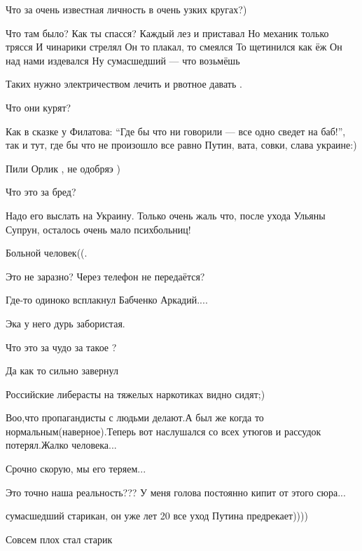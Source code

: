 \begin{itemize}
Что за очень известная личность в очень узких кругах?)


\obeycr
Что там было? Как ты спасся?
Каждый лез и приставал
Но механик только трясся
И чинарики стрелял
Он то плакал, то смеялся
То щетинился как ёж
Он над нами издевался
Ну сумасшедший — что возьмёшь
\restorecr

Таких нужно электричеством лечить и рвотное давать .

Что они курят?


Как в сказке у Филатова: \enquote{Где бы что ни говорили — все одно сведет на баб!},
так и тут, где бы что не произошло все равно Путин, вата, совки, слава
украине:)

Пили Орлик , не одобряэ )

Что это за бред?

Надо его выслать на Украину. Только очень жаль что, после ухода Ульяны Супрун,
осталось очень мало психбольниц!

Больной человек((.

Это не заразно? Через телефон не передаётся?

Где-то одиноко всплакнул Бабченко Аркадий....

Эка у него дурь забористая.

Что это за чудо за такое ?

Да как то сильно завернул 🤔

Российские либерасты на тяжелых наркотиках видно сидят;)

Воо,что пропагандисты с людьми делают.А был же когда то нормальным(наверное).Теперь вот наслушался со всех утюгов и рассудок потерял.Жалко человека...

Срочно скорую, мы его теряем...

Это точно наша реальность??? У меня голова постоянно кипит от этого сюра...

сумасшедший старикан, он уже лет 20 все уход Путина предрекает))))

Совсем плох стал старик


\end{itemize}
